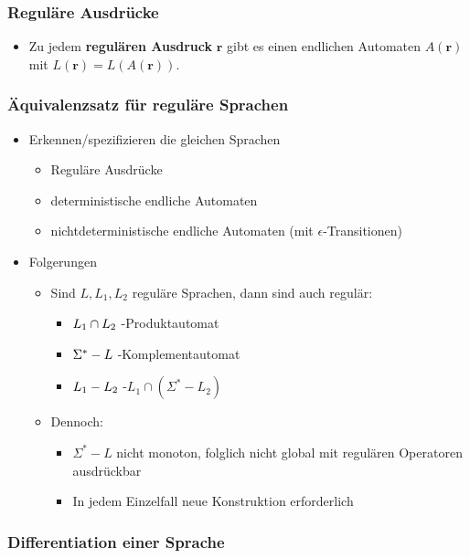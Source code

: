 \documentclass{scrartcl}
\begin{document}
\subsubsection{Reguläre Ausdrücke}

\begin{itemize}
	\item Zu jedem \textbf{regulären Ausdruck} $\mathbf{r}$ gibt es einen endlichen Automaten $A(\mathbf{r})$ mit $L(\mathbf{r}) = L(A(\mathbf{r}))$.
\end{itemize}

\subsubsection{Äquivalenzsatz für reguläre Sprachen}

\begin{itemize}
	\item Erkennen/spezifizieren die gleichen Sprachen
	\begin{itemize}
		\item Reguläre Ausdrücke
		\item deterministische endliche Automaten
		\item nichtdeterministische endliche Automaten (mit $\epsilon$-Transitionen)
	\end{itemize}
	\item Folgerungen
	\begin{itemize}
		\item Sind $L, L_1,L_2$ reguläre Sprachen, dann sind auch regulär:
		\begin{itemize}
			\item $L_1 \cap L_2 \hfill$ -Produktautomat
			\item $\Sigma^* - L \hfill$ -Komplementautomat
			\item $L_1 - L_2 \hfill$ -$L_1 \cap (\Sigma^* - L_2)$
		\end{itemize}
		\item Dennoch:
		\begin{itemize}
			\item $\Sigma^* - L$ nicht monoton, folglich nicht global mit regulären Operatoren ausdrückbar
			\item In jedem Einzelfall neue Konstruktion erforderlich
		\end{itemize}
	\end{itemize}
\end{itemize}

\subsubsection{Differentiation einer Sprache}
\end{document}

